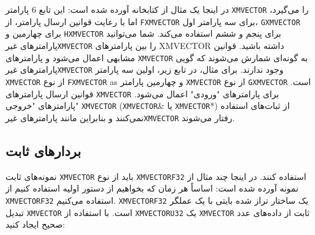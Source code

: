 {\begin{spacing}{1.5}
        در اینجا یک مثال از کتابخانه  آورده شده است:
        \textbf{\vspace{6pt}}
        \lr{}
        \textbf{\vspace{6pt}}
        این تابع $6$ پارامتر \texttt{XMVECTOR} را می‌گیرد، اما با رعایت قوانین ارسال پارامتر، از \texttt{FXMVECTOR} برای سه پارامتر اول، \texttt{GXMVECTOR} برای چهارمین و \texttt{HXMVECTOR} برای پنجم و ششم استفاده می‌کند.
        شما می‌توانید پارامترهای غیر‌\texttt{XMVECTOR} را بین پارامترهای XMVECTOR داشته باشید.
        قوانین مشابهی اعمال می‌شود و پارامترهای \texttt{XMVECTOR} به گونه‌ای شمارش می‌شوند که گویی پارامترهای غیر‌\texttt{XMVECTOR} وجود ندارند.
        برای مثال، در تابع زیر، اولین سه پارامتر \texttt{XMVECTOR} از نوع \texttt{FXMVECTOR} as و چهارمین پارامتر \texttt{XMVECTOR} از نوع \texttt{GXMVECTOR} است.
        \textbf{\vspace{6pt}}
        \lr{}
        \textbf{\vspace{6pt}}
        قوانین ارسال پارامترهای \texttt{XMVECTOR} برای پارامترهای "ورودی" اعمال می‌شود.
        پارامترهای "خروجی" \texttt{XMVECTOR} (\texttt{XMVECTOR}\& یا \texttt{XMVECTOR}*) از ثبات‌های  استفاده نمی‌کنند و بنابراین مانند پارامترهای غیر‌\texttt{XMVECTOR} رفتار می‌شوند.
    \end{spacing}
}

\subsection{\textbf{بردارهای ثابت}}
\label{subsec:1.6.4}
{
    \Large
    \begin{spacing}{1.5}
        نمونه‌های ثابت \texttt{XMVECTOR} باید از نوع \texttt{XMVECTORF32} استفاده کنند. در اینجا چند مثال از نمونه  آورده شده است:
        \textbf{\vspace{6pt}}
        \lr{}
        \textbf{\vspace{6pt}}
        اساساً هر زمان که بخواهیم از دستور اولیه استفاده کنیم از \texttt{XMVECTORF32} استفاده می‌کنیم.
        \texttt{XMVECTORF32} یک ساختار تراز شده  بایتی با یک عملگر تبدیل \texttt{XMVECTOR} است.
        \textbf{\vspace{6pt}}
        \lr{}
        \textbf{\vspace{6pt}}
        با استفاده از \texttt{XMVECTORU32} یک \texttt{XMVECTOR} ثابت از داده‌های عدد صحیح ایجاد کنید:
        \textbf{\vspace{6pt}}
        \lr{}
    \end{spacing}
}

